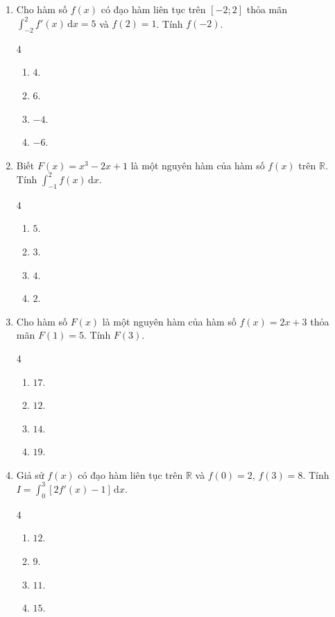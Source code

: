 \documentclass[12pt]{article}
\begin{document}
\begin{enumerate}[label=\textbf{Câu \arabic*.}]
		\item Cho hàm số $f(x)$ có đạo hàm liên tục trên $[-2; 2]$ thỏa mãn $\displaystyle \int_{-2}^{2} f'(x)\,\mathrm{d}x = 5$ và $f(2) = 1$. Tính $f(-2)$.
		\begin{multicols}{4}
			\begin{enumerate}[label=\textbf{\Alph*.}]
				\item $4$.
				\item $6$.
				\item $-4$.
				\item $-6$.
			\end{enumerate}
		\end{multicols}
		
		\item Biết $F(x) = x^3 - 2x + 1$ là một nguyên hàm của hàm số $f(x)$ trên $\mathbb{R}$. Tính $\displaystyle \int_{-1}^{2} f(x)\,\mathrm{d}x$.
		\begin{multicols}{4}
			\begin{enumerate}[label=\textbf{\Alph*.}]
				\item $5$.
				\item $3$.
				\item $4$.
				\item $2$.
			\end{enumerate}
		\end{multicols}
		
		\item Cho hàm số $F(x)$ là một nguyên hàm của hàm số $f(x) = 2x + 3$ thỏa mãn $F(1) = 5$. Tính $F(3)$.
		\begin{multicols}{4}
			\begin{enumerate}[label=\textbf{\Alph*.}]
				\item $17$.
				\item $12$.
				\item $14$.
				\item $19$.
			\end{enumerate}
		\end{multicols}
		
		\item Giả sử $f(x)$ có đạo hàm liên tục trên $\mathbb{R}$ và $f(0) = 2$, $f(3) = 8$. Tính $I = \displaystyle \int_{0}^{3} [2f'(x) - 1]\,\mathrm{d}x$.
		\begin{multicols}{4}
			\begin{enumerate}[label=\textbf{\Alph*.}]
				\item $12$.
				\item $9$.
				\item $11$.
				\item $15$.
			\end{enumerate}
		\end{multicols}
		

\end{enumerate}
\end{document}
